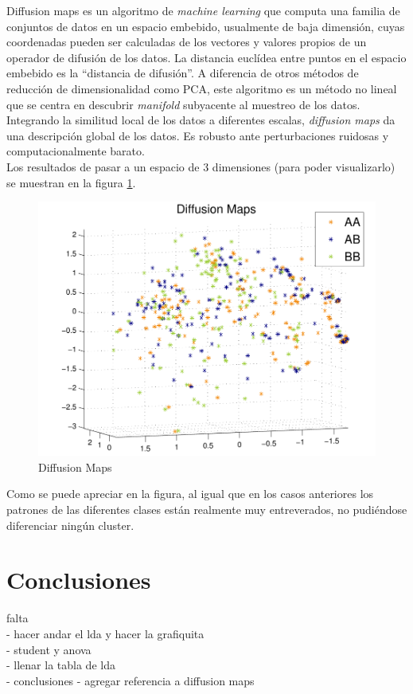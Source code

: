 \documentclass[12pt,a4paper,titlepage]{report}
\begin{document}
Diffusion maps es un algoritmo de \emph{machine learning} que computa una familia de conjuntos de datos en un espacio embebido, usualmente de baja dimensión, cuyas coordenadas pueden ser calculadas de los vectores y valores propios de un operador de difusión de los datos. La distancia euclídea entre puntos en el espacio embebido es la ``distancia de difusión''. A diferencia de otros métodos de reducción de dimensionalidad como PCA, este algoritmo es un método no lineal que se centra en descubrir \emph{manifold} subyacente al muestreo de los datos. Integrando la similitud local de los datos a diferentes escalas, \emph{diffusion maps} da una descripción global de los datos. Es robusto ante perturbaciones ruidosas y computacionalmente barato.\\

Los resultados de pasar a un espacio de 3 dimensiones (para poder visualizarlo) se muestran en la figura \ref{fig:dm}.
\begin{figure}[H]
	\centering 
	\includegraphics[width=.8\textwidth]{./pics/dm.pdf}
	\caption{Diffusion Maps}
	\label{fig:dm}
\end{figure}

Como se puede apreciar en la figura, al igual que en los casos anteriores los patrones de las diferentes clases están realmente muy entreverados, no pudiéndose diferenciar ningún cluster.


\chapter{Conclusiones}
falta\\
- hacer andar el lda y hacer la grafiquita\\
- student y anova\\
- llenar la tabla de lda\\
- conclusiones
- agregar referencia a diffusion maps
\end{document}
